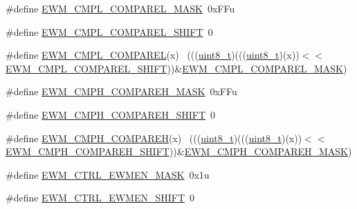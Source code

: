 \begin{DoxyCompactItemize}
\item 
\#define \hyperlink{group___e_w_m___register___masks_gaed4764277fd6da7338abe074b6ca509e}{E\+W\+M\+\_\+\+C\+M\+P\+L\+\_\+\+C\+O\+M\+P\+A\+R\+E\+L\+\_\+\+M\+A\+SK}~0x\+F\+Fu
\item 
\#define \hyperlink{group___e_w_m___register___masks_ga34ba2acd3dfb6ac825d6ca812b4461fd}{E\+W\+M\+\_\+\+C\+M\+P\+L\+\_\+\+C\+O\+M\+P\+A\+R\+E\+L\+\_\+\+S\+H\+I\+FT}~0
\item 
\#define \hyperlink{group___e_w_m___register___masks_ga227fbc36660dcf0e564dd4496832155c}{E\+W\+M\+\_\+\+C\+M\+P\+L\+\_\+\+C\+O\+M\+P\+A\+R\+EL}(x)                                      ~(((\hyperlink{_p_e___types_8h_aba7bc1797add20fe3efdf37ced1182c5}{uint8\+\_\+t})(((\hyperlink{_p_e___types_8h_aba7bc1797add20fe3efdf37ced1182c5}{uint8\+\_\+t})(x))$<$$<$\hyperlink{group___e_w_m___register___masks_ga34ba2acd3dfb6ac825d6ca812b4461fd}{E\+W\+M\+\_\+\+C\+M\+P\+L\+\_\+\+C\+O\+M\+P\+A\+R\+E\+L\+\_\+\+S\+H\+I\+FT}))\&\hyperlink{group___e_w_m___register___masks_gaed4764277fd6da7338abe074b6ca509e}{E\+W\+M\+\_\+\+C\+M\+P\+L\+\_\+\+C\+O\+M\+P\+A\+R\+E\+L\+\_\+\+M\+A\+SK})
\item 
\#define \hyperlink{group___e_w_m___register___masks_ga2bba159a8c0eaace911da192c1747c73}{E\+W\+M\+\_\+\+C\+M\+P\+H\+\_\+\+C\+O\+M\+P\+A\+R\+E\+H\+\_\+\+M\+A\+SK}~0x\+F\+Fu
\item 
\#define \hyperlink{group___e_w_m___register___masks_ga02d5e37ee2e38be4d3654c4eb0854cb5}{E\+W\+M\+\_\+\+C\+M\+P\+H\+\_\+\+C\+O\+M\+P\+A\+R\+E\+H\+\_\+\+S\+H\+I\+FT}~0
\item 
\#define \hyperlink{group___e_w_m___register___masks_ga2aac9dac08a753ede317faba6cd38c39}{E\+W\+M\+\_\+\+C\+M\+P\+H\+\_\+\+C\+O\+M\+P\+A\+R\+EH}(x)                                      ~(((\hyperlink{_p_e___types_8h_aba7bc1797add20fe3efdf37ced1182c5}{uint8\+\_\+t})(((\hyperlink{_p_e___types_8h_aba7bc1797add20fe3efdf37ced1182c5}{uint8\+\_\+t})(x))$<$$<$\hyperlink{group___e_w_m___register___masks_ga02d5e37ee2e38be4d3654c4eb0854cb5}{E\+W\+M\+\_\+\+C\+M\+P\+H\+\_\+\+C\+O\+M\+P\+A\+R\+E\+H\+\_\+\+S\+H\+I\+FT}))\&\hyperlink{group___e_w_m___register___masks_ga2bba159a8c0eaace911da192c1747c73}{E\+W\+M\+\_\+\+C\+M\+P\+H\+\_\+\+C\+O\+M\+P\+A\+R\+E\+H\+\_\+\+M\+A\+SK})
\item 
\#define \hyperlink{group___e_w_m___register___masks_ga7426f0a484ad28b92efb90ef0e3f01fd}{E\+W\+M\+\_\+\+C\+T\+R\+L\+\_\+\+E\+W\+M\+E\+N\+\_\+\+M\+A\+SK}~0x1u
\item 
\#define \hyperlink{group___e_w_m___register___masks_gafac96f184ce423d5872e0ca6e258d004}{E\+W\+M\+\_\+\+C\+T\+R\+L\+\_\+\+E\+W\+M\+E\+N\+\_\+\+S\+H\+I\+FT}~0

\end{DoxyCompactItemize}
